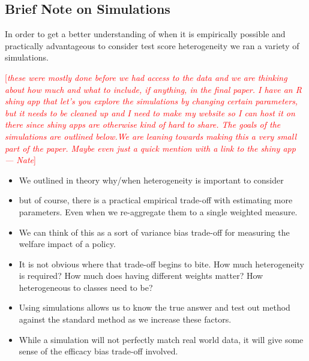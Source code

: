 \documentclass[12pt]{article}
\theoremstyle{definition}
\theoremstyle{definition}
\theoremstyle{definition}
\theoremstyle{definition}
\newcommand\cmnt[2]{\;
{\textcolor{red}{[{\em #1 --- #2}] \;}
}}
\newcommand\nate[1]{\cmnt{#1}{Nate}}
\begin{document}
    \subsection{Brief Note on Simulations }
        In order to get a better understanding of when it is empirically possible and practically advantageous to consider test score heterogeneity we ran a variety of simulations. 

        \nate{these were mostly done before we had access to the data and we are thinking about how much and what to include, if anything, in the final paper. I have an R shiny app that let's you explore the simulations by changing certain parameters, but it needs to be cleaned up and I need to make my website so I can host it on there since shiny apps are otherwise kind of hard to share. The goals of the simulations are outlined below.We are leaning towards making this a very small part of the paper. Maybe even just a quick mention with a link to the shiny app}
        \begin{itemize}
            \item We outlined in theory why/when heterogeneity is important to consider
            \item but of course, there is a practical empirical trade-off with estimating more parameters. Even when we re-aggregate them to a single weighted measure. 
            \item We can think of this as a sort of variance bias trade-off for measuring the welfare impact of a policy. 
            \item It is not obvious where that trade-off begins to bite. How much heterogeneity is required? How much does having different weights matter? How heterogeneous to classes need to be? 
            \item Using simulations allows us to know the true answer and test out method against the standard method as we increase these factors. 
            \item While a simulation will not perfectly match real world data, it will give some sense of the efficacy bias trade-off involved. 
            
        \end{itemize}
        
        
\end{document}
